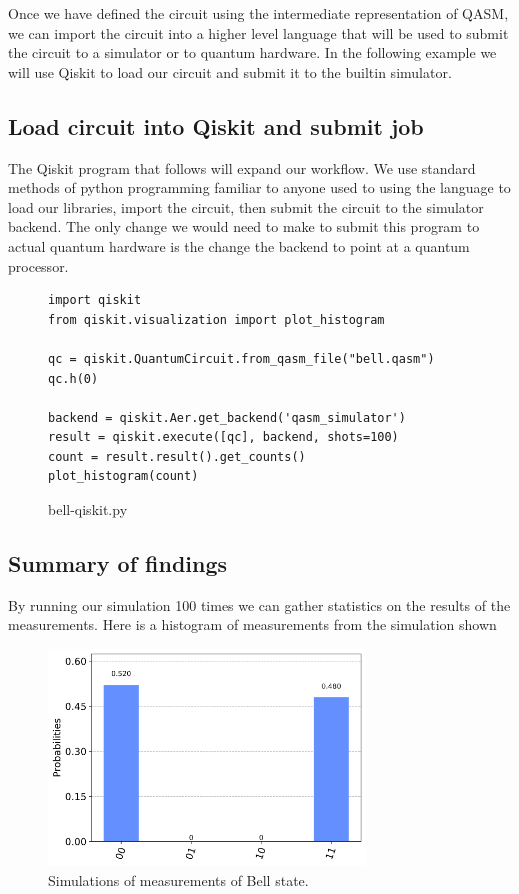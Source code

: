 \documentclass{article}
\begin{document}
Once we have defined the circuit using the intermediate representation of QASM, we can import the circuit into a higher level language that will be used to submit the circuit to a simulator or to quantum hardware. In the following example we will use Qiskit to load our circuit and submit it to the builtin simulator.

\subsection{Load circuit into Qiskit and submit job}

The Qiskit program that follows will expand our workflow. We use standard methods of python programming familiar to anyone used to using the language to load our libraries, import the circuit, then submit the circuit to the simulator backend. The only change we would need to make to submit this program to actual quantum hardware is the change the backend to point at a quantum processor.

\begin{samepage}
\begin{figure}[H]
\begin{verbatim}
import qiskit
from qiskit.visualization import plot_histogram

qc = qiskit.QuantumCircuit.from_qasm_file("bell.qasm")
qc.h(0)

backend = qiskit.Aer.get_backend('qasm_simulator')
result = qiskit.execute([qc], backend, shots=100)
count = result.result().get_counts()
plot_histogram(count)
\end{verbatim}
\caption{bell-qiskit.py}
\end{figure}
\end{samepage}

\subsection{Summary of findings}
By running our simulation 100 times we can gather statistics on the results of the measurements. Here is a histogram of measurements from the simulation shown

\begin{figure}[H]
    \centering
    \includegraphics[width=0.75\textwidth]{histogram.png}
    \caption{Simulations of measurements of Bell state.}
\end{figure}
\end{document}
